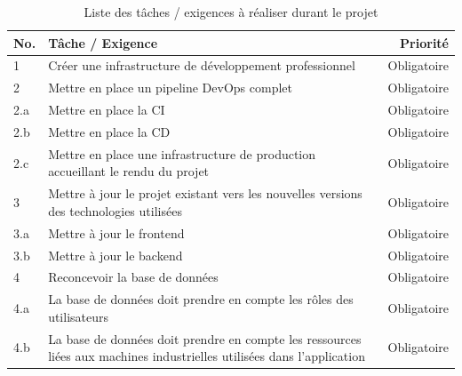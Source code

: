 \documentclass[
    iai, %
    il, %
]{heig-tb}
\begin{document}
\begin{table}[h]
    \begin{center}
        \caption{Liste des tâches / exigences à réaliser durant le projet \label{taches}}
        \begin{tabularx}{1.0\textwidth} {l|X|r}
            No. & Tâche / Exigence                                                                                                       & Priorité      \\ \hline
            1   & Créer une infrastructure de développement professionnel                                                                & Obligatoire   \\
            2   & Mettre en place un pipeline DevOps complet                                                                             & Obligatoire   \\
            2.a & Mettre en place la CI                                                                                                  & Obligatoire   \\
            2.b & Mettre en place la CD                                                                                                  & Obligatoire   \\
            2.c & Mettre en place une infrastructure de production accueillant le rendu du projet                                        & Obligatoire   \\
            3   & Mettre à jour le projet existant vers les nouvelles versions des technologies utilisées                                & Obligatoire   \\
            3.a & Mettre à jour le frontend                                                                                              & Obligatoire   \\
            3.b & Mettre à jour le backend                                                                                               & Obligatoire   \\
            4   & Reconcevoir la base de données                                                                                         & Obligatoire   \\
            4.a & La base de données doit prendre en compte les rôles des utilisateurs                                                   & Obligatoire   \\
            4.b & La base de données doit prendre en compte les ressources liées aux machines industrielles utilisées dans l'application & Obligatoire   \\

\end{tabularx}
\end{center}
\end{table}
\end{document}
